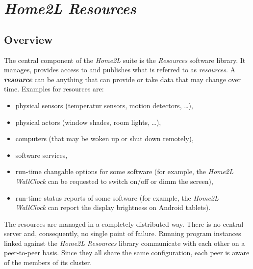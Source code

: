 \documentclass[12pt,english,parskip=half,headheight=19pt]{scrreprt}
\begin{document}






%
\chapter{\textit{Home2L Resources}}
\label{ch:resources}
%



\section{Overview}
\label{sec:resources-overview}


The central component of the \textit{Home2L} suite is the \textit{Resources}
software library. It manages, provides access to and publishes what is referred
to as \textit{resources}. A \textbf{\textit{resource}} can be anything that can
provide or take data that may change over time.
Examples for resources are:

\begin{itemize}
\item
  physical sensors (temperatur sensors, motion detectors, \ldots{}),
\item
  physical actors (window shades, room lights, \ldots{}),
\item
  computers (that may be woken up or shut down remotely),
\item
  software services,
\item
  run-time changable options for some software (for example, the
  \textit{Home2L WallClock} can be requested to switch on/off or dimm the
  screen),
\item
  run-time status reports of some software (for example, the
  \textit{Home2L WallClock} can report the display brightness on Android
  tablets).
\end{itemize}

The resources are managed in a completely distributed way. There is no
central server and, consequently, no single point of failure. Running
program instances linked against the \textit{Home2L Resources} library communicate
with each other on a peer-to-peer basis. Since they all share the same
configuration, each peer is aware of the members of its cluster.
\end{document}
